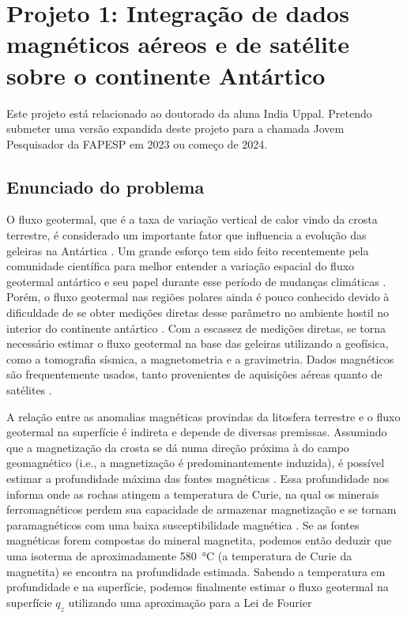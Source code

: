 \documentclass[12pt,a4paper,oneside]{book}
\begin{document}
\section{%
  Projeto 1: Integração de dados magnéticos aéreos e de satélite sobre o
  continente Antártico
}

Este projeto está relacionado ao doutorado da aluna India Uppal. Pretendo
submeter uma versão expandida deste projeto para a chamada Jovem Pesquisador da
FAPESP em 2023 ou começo de 2024.

\subsection{Enunciado do problema}

O fluxo geotermal, que é a taxa de variação vertical de calor vindo da
crosta terrestre, é considerado um importante fator que influencia a evolução
das geleiras na Antártica \citep{Seroussi2017}.
Um grande esforço tem sido feito recentemente pela comunidade científica para
melhor entender a variação espacial do fluxo geotermal antártico e seu papel
durante esse período de mudanças climáticas \citep{BurtonJohnson2020}.
Porém, o fluxo geotermal nas regiões polares ainda é pouco conhecido devido à
dificuldade de se obter medições diretas desse parâmetro no ambiente hostil no
interior do continente antártico \citep{BurtonJohnson2020}.
Com a escassez de medições diretas, se torna necessário estimar o fluxo
geotermal na base das geleiras utilizando a geofísica, como a tomografia
sísmica, a magnetometria e a gravimetria.
Dados magnéticos são frequentemente usados, tanto provenientes de aquisições
aéreas \citep[e.g.,][]{Lowe2023} quanto de satélites
\citep[e.g.,][]{FoxMaule2005}.

A relação entre as anomalias magnéticas provindas da litosfera terrestre e o
fluxo geotermal na superfície é indireta e depende de diversas premissas.
Assumindo que a magnetização da crosta se dá numa direção próxima à do campo
geomagnético (i.e., a magnetização é predominantemente induzida), é possível
estimar a profundidade máxima das fontes magnéticas \citep{Spector1970}.
Essa profundidade nos informa onde as rochas atingem a temperatura de Curie,
na qual os minerais ferromagnéticos perdem sua capacidade de armazenar
magnetização e se tornam paramagnéticos com uma baixa susceptibilidade
magnética \citep{Blakely1988}.
Se as fontes magnéticas forem compostas do mineral magnetita, podemos então
deduzir que uma isoterma de aproximadamente \qty{580}{\degreeCelsius} (a
temperatura de Curie da magnetita) se encontra na profundidade estimada.
Sabendo a temperatura em profundidade e na superfície, podemos finalmente
estimar o fluxo geotermal na superfície $q_z$ utilizando uma aproximação para a
Lei de Fourier
\end{document}
